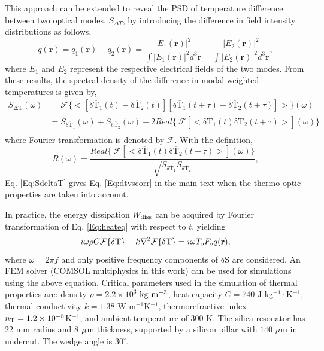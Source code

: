 \documentclass[noshowpacs,amsmath,
twocolumn,
superscriptaddress,
8pt,
aps,prb]{revtex4-2}
\begin{document}
\begin{footnotesize}
This approach can be extended to reveal the PSD of temperature difference between two optical modes, $S_{\Delta T}$, by introducing the difference in field intensity distributions as follows,
\begin{equation}
    q(\mathbf{r})=q_1(\mathbf{r})-q_2(\mathbf{r})=\frac{|E_{1}(\mathbf{r})|^{2}}{\int|E_{1}(\mathbf{r})|^{2}d^{3}\mathbf{r}}-\frac{|E_{2}(\mathbf{r})|^{2}}{\int|E_{2}(\mathbf{r})|^{2}d^{3}\mathbf{r}},
\end{equation}
where $E_1$ and $E_2$ represent the respective electrical fields of the two modes. From these results, the spectral density of the difference in modal-weighted temperatures is  given by,
\begin{equation}
\begin{split}
    S_{\mathrm{\Delta T}}(\omega)&=\mathcal{F}\{<[\overline{\mathrm{\delta T_1}}(t)-\overline{\mathrm{\delta T_2}}(t)][\overline{\mathrm{\delta T_1}}(t+\tau)-\overline{\mathrm{\delta T_2}}(t+\tau)]>\}(\omega)\\
    &=S_{\overline{\mathrm{\delta T_1}}}(\omega)+S_{\overline{\mathrm{\delta T_2}}}(\omega)-2Real\{ \:\mathcal{F}[<\overline{\mathrm{\delta T_1}}(t)\overline{\mathrm{\delta T_2}}(t+\tau)>](\omega)\}\\
    \end{split}
    \label{Eq:SdeltaT}
\end{equation}
where Fourier transformation is denoted by $\mathcal{F}$. With the definition,
\begin{equation}
    R (\omega) = \frac{Real\{ \:\mathcal{F}[<\overline{\mathrm{\delta T_1}}(t)\overline{\mathrm{\delta T_2}}(t+\tau)>](\omega)\}} {\sqrt{ S_{\overline{\mathrm{\delta T_1}}} S_{\overline{\mathrm{\delta T_2}}} }}, 
    \label{Eq:normcorr}
\end{equation}
Eq. \ref{Eq:SdeltaT} gives Eq. \ref{Eq:dtvscorr} in the main text when the thermo-optic properties are taken into account.

In practice, the energy dissipation $W_{\rm diss}$ can be acquired by Fourier transformation of Eq. \ref{Eq:heateq} with respect to $t$, yielding
\begin{equation}
    i \omega \rho C \mathcal{F}\{\mathrm{\delta T}\}-k \nabla ^2 \mathcal{F}\{\mathrm{\delta T}\}=i \omega T_{\rm o} F_{\rm o} q(\mathbf{r}),
    \label{Eq:fourier}
\end{equation}
where $\omega=2\pi f$ and only positive frequency components of $\mathrm{\delta S}$ are considered. An FEM solver (COMSOL multiphysics in this work) can be used for simulations using the above equation. Critical parameters used in the simulation of thermal properties are: density $\rho=2.2\times 10^{3}$ $\rm kg~m^{-3}$, heat capacity $C=740$ J kg$^{-1}\cdot$K$^{-1}$, thermal conductivity $k=1.38$ W  m$^{-1}$K$^{-1}$, thermorefractive index $n_{\rm T}=1.2 \times 10^{-5}$K$^{-1}$, and ambient temperature of 300 K. The silica resonator has 22 mm radius and $8$ $\rm \mu$m thickness, supported by a silicon pillar with $140 $ $\mu$m in undercut. The wedge angle is $30 ^{\circ}$.


\end{footnotesize}
\end{document}
